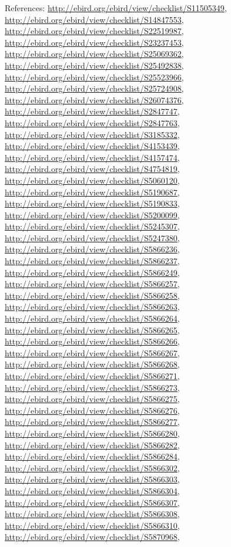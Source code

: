 \documentclass[9pt, article]{memoir}
\begin{document}
\begin{multicols}{2}
References: 
\url{http://ebird.org/ebird/view/checklist/S11505349}, 
\url{http://ebird.org/ebird/view/checklist/S14847553}, 
\url{http://ebird.org/ebird/view/checklist/S22519987}, 
\url{http://ebird.org/ebird/view/checklist/S23237453}, 
\url{http://ebird.org/ebird/view/checklist/S25069362}, 
\url{http://ebird.org/ebird/view/checklist/S25492838}, 
\url{http://ebird.org/ebird/view/checklist/S25523966}, 
\url{http://ebird.org/ebird/view/checklist/S25724908}, 
\url{http://ebird.org/ebird/view/checklist/S26074376}, 
\url{http://ebird.org/ebird/view/checklist/S2847747}, 
\url{http://ebird.org/ebird/view/checklist/S2847763}, 
\url{http://ebird.org/ebird/view/checklist/S3185332}, 
\url{http://ebird.org/ebird/view/checklist/S4153439}, 
\url{http://ebird.org/ebird/view/checklist/S4157474}, 
\url{http://ebird.org/ebird/view/checklist/S4754819}, 
\url{http://ebird.org/ebird/view/checklist/S5060120}, 
\url{http://ebird.org/ebird/view/checklist/S5190687}, 
\url{http://ebird.org/ebird/view/checklist/S5190833}, 
\url{http://ebird.org/ebird/view/checklist/S5200099}, 
\url{http://ebird.org/ebird/view/checklist/S5245307}, 
\url{http://ebird.org/ebird/view/checklist/S5247380}, 
\url{http://ebird.org/ebird/view/checklist/S5866236}, 
\url{http://ebird.org/ebird/view/checklist/S5866237}, 
\url{http://ebird.org/ebird/view/checklist/S5866249}, 
\url{http://ebird.org/ebird/view/checklist/S5866257}, 
\url{http://ebird.org/ebird/view/checklist/S5866258}, 
\url{http://ebird.org/ebird/view/checklist/S5866263}, 
\url{http://ebird.org/ebird/view/checklist/S5866264}, 
\url{http://ebird.org/ebird/view/checklist/S5866265}, 
\url{http://ebird.org/ebird/view/checklist/S5866266}, 
\url{http://ebird.org/ebird/view/checklist/S5866267}, 
\url{http://ebird.org/ebird/view/checklist/S5866268}, 
\url{http://ebird.org/ebird/view/checklist/S5866271}, 
\url{http://ebird.org/ebird/view/checklist/S5866273}, 
\url{http://ebird.org/ebird/view/checklist/S5866275}, 
\url{http://ebird.org/ebird/view/checklist/S5866276}, 
\url{http://ebird.org/ebird/view/checklist/S5866277}, 
\url{http://ebird.org/ebird/view/checklist/S5866280}, 
\url{http://ebird.org/ebird/view/checklist/S5866282}, 
\url{http://ebird.org/ebird/view/checklist/S5866284}, 
\url{http://ebird.org/ebird/view/checklist/S5866302}, 
\url{http://ebird.org/ebird/view/checklist/S5866303}, 
\url{http://ebird.org/ebird/view/checklist/S5866304}, 
\url{http://ebird.org/ebird/view/checklist/S5866307}, 
\url{http://ebird.org/ebird/view/checklist/S5866308}, 
\url{http://ebird.org/ebird/view/checklist/S5866310}, 
\url{http://ebird.org/ebird/view/checklist/S5870968}, 

\end{multicols}
\end{document}
